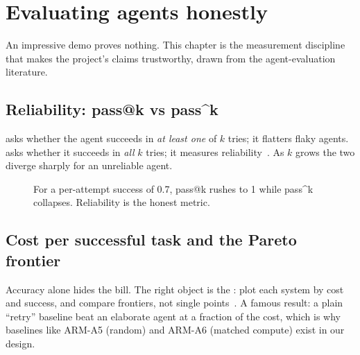 \chapter{Evaluating agents honestly}
\label{ch:eval}

An impressive demo proves nothing. This chapter is the measurement discipline that makes the
project's claims trustworthy, drawn from the agent-evaluation literature.

\section{Reliability: pass@k vs pass\textasciicircum k}

 asks whether the agent succeeds in \emph{at least one} of $k$ tries; it flatters
flaky agents.  asks whether it succeeds in \emph{all} $k$ tries; it measures
reliability~\citep{tau_bench}. As $k$ grows the two diverge sharply for an unreliable agent.

\begin{figure}[h]\centering
{}
\caption{For a per-attempt success of 0.7, pass@k rushes to 1 while pass\textasciicircum k
collapses. Reliability is the honest metric.}
\label{fig:passk}
\end{figure}

\section{Cost per successful task and the Pareto frontier}

Accuracy alone hides the bill. The right object is the :
plot each system by cost and success, and compare frontiers, not single
points~\citep{ai_agents_that_matter}. A famous result: a plain ``retry'' baseline beat an
elaborate agent at a fraction of the cost, which is why baselines like ARM-A5 (random) and
ARM-A6 (matched compute) exist in our design.

